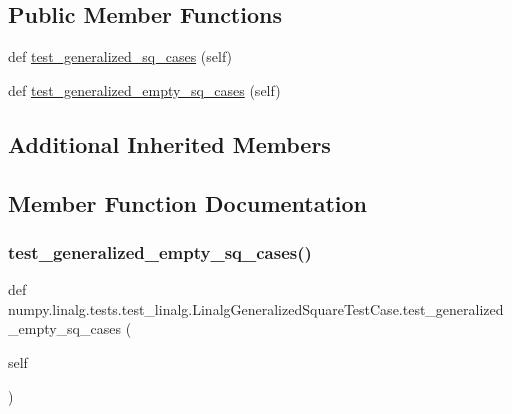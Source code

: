 \subsection*{Public Member Functions}
\begin{DoxyCompactItemize}
\item 
def \hyperlink{classnumpy_1_1linalg_1_1tests_1_1test__linalg_1_1LinalgGeneralizedSquareTestCase_af46a6af0776af94a644fea10afa5beae}{test\+\_\+generalized\+\_\+sq\+\_\+cases} (self)
\item 
def \hyperlink{classnumpy_1_1linalg_1_1tests_1_1test__linalg_1_1LinalgGeneralizedSquareTestCase_a64bb3af9ca11b3c6e9cf05905c18bc8a}{test\+\_\+generalized\+\_\+empty\+\_\+sq\+\_\+cases} (self)
\end{DoxyCompactItemize}
\subsection*{Additional Inherited Members}


\subsection{Member Function Documentation}
\mbox{\label{classnumpy_1_1linalg_1_1tests_1_1test__linalg_1_1LinalgGeneralizedSquareTestCase_a64bb3af9ca11b3c6e9cf05905c18bc8a}} 
\subsubsection{\texorpdfstring{test\+\_\+generalized\+\_\+empty\+\_\+sq\+\_\+cases()}{test\_generalized\_empty\_sq\_cases()}}
{\footnotesize\ttfamily def numpy.\+linalg.\+tests.\+test\+\_\+linalg.\+Linalg\+Generalized\+Square\+Test\+Case.\+test\+\_\+generalized\+\_\+empty\+\_\+sq\+\_\+cases (\begin{DoxyParamCaption}\item[{}]{self }\end{DoxyParamCaption})}


